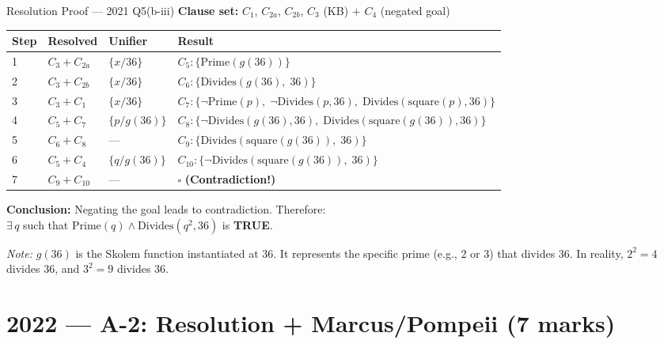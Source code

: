 \documentclass[12pt,a4paper]{article}
\newcommand{\cl}[1]{\{#1\}}      %
\begin{document}
\begin{solbox}{Resolution Proof --- 2021 Q5(b-iii)}
\textbf{Clause set:}
\quad $C_1$, $C_{2a}$, $C_{2b}$, $C_3$ (KB) $+$ $C_4$ (negated goal)

\medskip
\begin{tabular}{@{}l@{\;\;}l@{\;\;}l@{\;\;}l@{}}
  \toprule
  \textbf{Step} & \textbf{Resolved} & \textbf{Unifier} & \textbf{Result} \\
  \midrule
  1 & $C_3 + C_{2a}$ & $\{x/36\}$ & $C_5: \cl{\mathrm{Prime}(g(36))}$ \\[3pt]
  2 & $C_3 + C_{2b}$ & $\{x/36\}$ & $C_6: \cl{\mathrm{Divides}(g(36),\;36)}$ \\[3pt]
  3 & $C_3 + C_1$ & $\{x/36\}$ & $C_7: \cl{\neg\mathrm{Prime}(p),\;\neg\mathrm{Divides}(p,36),\;\mathrm{Divides}(\mathrm{square}(p),36)}$ \\[3pt]
  4 & $C_5 + C_7$ & $\{p/g(36)\}$ & $C_8: \cl{\neg\mathrm{Divides}(g(36),36),\;\mathrm{Divides}(\mathrm{square}(g(36)),36)}$ \\[3pt]
  5 & $C_6 + C_8$ & --- & $C_9: \cl{\mathrm{Divides}(\mathrm{square}(g(36)),\;36)}$ \\[3pt]
  6 & $C_5 + C_4$ & $\{q/g(36)\}$ & $C_{10}: \cl{\neg\mathrm{Divides}(\mathrm{square}(g(36)),\;36)}$ \\[3pt]
  7 & $C_9 + C_{10}$ & --- & $\boxed{\square}$ \textbf{(Contradiction!)} \\
  \bottomrule
\end{tabular}

\medskip
\textbf{Conclusion:} Negating the goal leads to contradiction. Therefore:\\
$\exists\,q$ such that $\mathrm{Prime}(q) \land \mathrm{Divides}(q^2, 36)$ is \textbf{TRUE}. \checkmark

\medskip
\textit{Note:} $g(36)$ is the Skolem function instantiated at 36. It represents the specific prime (e.g., 2 or 3) that divides 36. In reality, $2^2 = 4$ divides 36, and $3^2 = 9$ divides 36.
\end{solbox}

\newpage
\section{2022 --- A-2: Resolution + Marcus/Pompeii (7 marks)}
\end{document}
